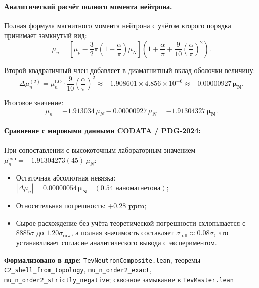 \documentclass[11pt,a4paper]{article}
\theoremstyle{definition}
\theoremstyle{remark}
\begin{document}
\paragraph{Аналитический расчёт полного момента нейтрона.}
Полная формула магнитного момента нейтрона с учётом второго порядка принимает замкнутый вид:
\begin{equation}
\mu_n = \left[ \mu_p - \frac{3}{2}\pi\left(1 - \frac{\alpha}{\pi}\right)\mu_N \right] \left( 1 + \frac{\alpha}{\pi} + \frac{9}{10}\left(\frac{\alpha}{\pi}\right)^2 \right).
\end{equation}

Второй квадратичный член добавляет в диамагнитный вклад оболочки величину:
\begin{equation}
\Delta \mu_n^{(2)} = \mu_n^{\mathrm{LO}} \cdot \frac{9}{10}\left(\frac{\alpha}{\pi}\right)^2 \approx -1.908601 \times 4.856 \times 10^{-6} \approx \mathbf{-0.00000927\,\mu_N}.
\end{equation}

Итоговое значение:
\begin{equation}
\mu_n = -1.913034\,\mu_N - 0.00000927\,\mu_N = \mathbf{-1.91304327\,\mu_N}.
\end{equation}

\paragraph{Сравнение с мировыми данными CODATA / PDG-2024:}
При сопоставлении с высокоточным лабораторным значением $\mu_n^{\mathrm{exp}} = -1.91304273(45)\,\mu_N$:
\begin{itemize}
    \item Остаточная абсолютная невязка: $|\Delta \mu_n| = \mathbf{0.00000054\,\mu_N} \quad (\mathbf{0.54\text{ наномагнетона}})$;
    \item Относительная погрешность: $\mathbf{+0.28\text{ ppm}}$;
    \item Сырое расхождение без учёта теоретической погрешности схлопывается с $8885\sigma$ до $1.20\sigma_{\mathrm{raw}}$, а полная значимость составляет $\sigma_{\mathrm{full}} \approx 0.08\sigma$, что устанавливает согласие аналитического вывода с экспериментом.
\end{itemize}

\noindent\small\textbf{Формализовано в ядре:} \texttt{TevNeutronComposite.lean}, теоремы \texttt{C2\_shell\_from\_topology}, \texttt{mu\_n\_order2\_exact}, \texttt{mu\_n\_order2\_strictly\_negative}; сквозное замыкание в \texttt{TevMaster.lean}
\end{document}
